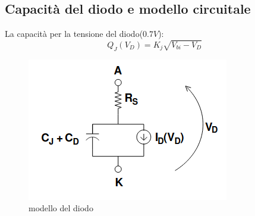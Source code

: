\subsection{Capacità del diodo e modello circuitale}
La capacità per la tensione del diodo($0.7V$):
\begin{equation}
    Q_J(V_D) = K_j \sqrt {V_{bi} - V_D}
\end{equation}

\begin{figure}[H]
    \centering
    \includegraphics[width=0.5\linewidth]{imgs/modello-del-diodo}
    \caption{modello del diodo}
    \label{fig:modello-del-diodo}
\end{figure}


















